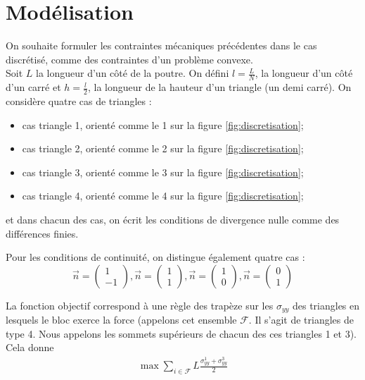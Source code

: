\newpage
\setcounter{page}{1}
\section{Modélisation}
On souhaite formuler les contraintes mécaniques précédentes dans le cas discrétisé, comme des contraintes d'un problème convexe.\\

Soit $L$ la longueur d'un côté de la poutre. On défini $l=\frac{L}{N}$, la longueur d'un côté d'un carré et $h=\frac{l}{2}$, la longueur de la hauteur d'un triangle (un demi carré). On considère quatre cas de triangles : 
\begin{itemize}
\item cas triangle 1, orienté comme le 1 sur la figure \ref{fig:discretisation};
\item cas triangle 2, orienté comme le 2 sur la figure \ref{fig:discretisation};
\item cas triangle 3, orienté comme le 3 sur la figure \ref{fig:discretisation};
\item cas triangle 4, orienté comme le 4 sur la figure \ref{fig:discretisation};
\end{itemize} 
et dans chacun des cas, on écrit les conditions de divergence nulle comme des différences finies. 

Pour les conditions de continuité, on distingue également quatre cas : 
\begin{equation}
\overrightarrow{n} = \begin{pmatrix}
1\\
-1
\end{pmatrix}, 
\overrightarrow{n} = \begin{pmatrix}
1\\
1
\end{pmatrix}, 
\overrightarrow{n} = \begin{pmatrix}
1\\
0
\end{pmatrix},
\overrightarrow{n} = \begin{pmatrix}
0\\
1
\end{pmatrix}
\end{equation}

La fonction objectif correspond à une règle des trapèze sur les $\sigma_{yy}$ des triangles en lesquels le bloc exerce la force (appelons cet ensemble $\mathcal{F}$. Il s'agit de triangles de type 4. Nous appelons les sommets supérieurs de chacun des ces triangles 1 et 3). Cela donne
\begin{align*}
\max \sum_{i \in \mathcal{F}} L \frac{\sigma_{yy}^1 + \sigma_{yy}^3}{2}
\end{align*}

